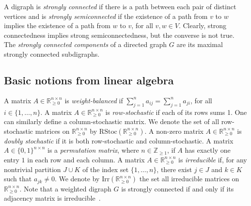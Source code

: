 \documentclass[final]{siamltex}
\begin{document}
A digraph is \emph{strongly connected} if there is a path between each
pair of distinct vertices and is \emph{strongly semiconnected} if the
existence of a path from $ v $ to $ w $ implies the existence of a
path from $ w $ to $ v $, for all $ v,w\in V $. Clearly, strong
connectedness implies strong semiconnectedness, but the converse is
not true.  The \emph{strongly connected components} of a directed
graph $ G $ are its maximal strongly connected subdigraphs.

\subsection{Basic notions from linear algebra}
A matrix $ A \in \mathbb{R}^{n\times n}_{\geq 0}$ is
\emph{weight-balanced} if $ \sum_{j=1}^{n}a_{ij}=\sum_{j=1}^{n}a_{ji}
$, for all $ i\in \{1,\ldots,n\} $.  A matrix $ A \in
\mathbb{R}^{n\times n}_{\geq 0}$ is \emph{row-stochastic} if each of
its rows sums 1. One can similarly define a column-stochastic matrix.
We denote the set of all row-stochastic matrices on $ \mathbb{R}_{\geq
  0}^{n\times n} $ by $ \mathrm{RStoc}(\mathbb{R}_{\geq 0}^{n\times
  n}) $.  A non-zero matrix $ A \in \mathbb{R}^{n\times n}_{\geq 0} $
is \emph{doubly stochastic} if it is both row-stochastic and
column-stochastic.  A matrix $ A \in \{0,1\}^{n\times n} $ is a
\emph{permutation matrix}, where $ n \in \mathbb{Z}_{\geq 1} $, if $ A
$ has exactly one entry $ 1 $ in each row and each column. A matrix $
A \in \mathbb{R}^{n\times n}_{\geq 0}$ is \emph{irreducible} if, for
any nontrivial partition $ J\cup K $ of the index set $ \{1, \ldots,
n\}$, there exist $ j \in J $ and $ k\in K $ such that $ a_{jk} \neq
0$. We denote by $ \mathrm{Irr}(\mathbb{R}_{\geq 0}^{n\times n}) $ the
set all irreducible matrices on $ \mathbb{R}_{\geq 0}^{n\times n} $.
Note that a weighted digraph $ G $ is strongly connected if and only
if its adjacency matrix is irreducible~\cite{NB:94}.
\end{document}

